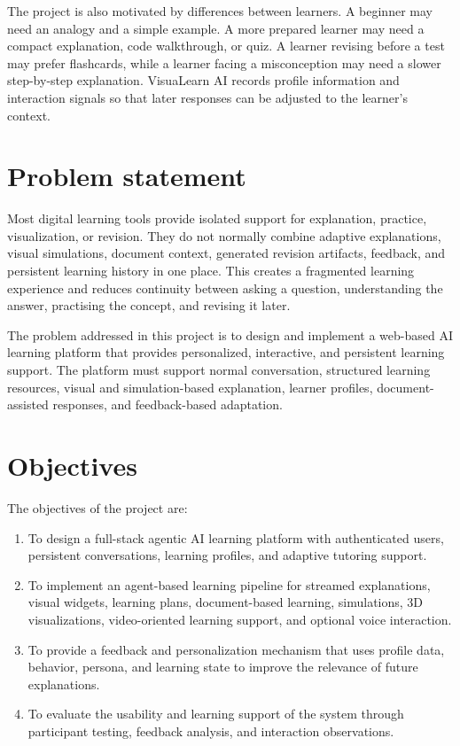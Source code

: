 The project is also motivated by differences between learners. A beginner may need an analogy and a simple example. A more prepared learner may need a compact explanation, code walkthrough, or quiz. A learner revising before a test may prefer flashcards, while a learner facing a misconception may need a slower step-by-step explanation. VisuaLearn AI records profile information and interaction signals so that later responses can be adjusted to the learner's context.

\section[Problem statement]{\textbf{Problem statement}}

Most digital learning tools provide isolated support for explanation, practice, visualization, or revision. They do not normally combine adaptive explanations, visual simulations, document context, generated revision artifacts, feedback, and persistent learning history in one place. This creates a fragmented learning experience and reduces continuity between asking a question, understanding the answer, practising the concept, and revising it later.

The problem addressed in this project is to design and implement a web-based AI learning platform that provides personalized, interactive, and persistent learning support. The platform must support normal conversation, structured learning resources, visual and simulation-based explanation, learner profiles, document-assisted responses, and feedback-based adaptation.

\section[Objectives]{\textbf{Objectives}}

The objectives of the project are:
\begin{enumerate}[leftmargin=1.2cm]
\item To design a full-stack agentic AI learning platform with authenticated users, persistent conversations, learning profiles, and adaptive tutoring support.
\item To implement an agent-based learning pipeline for streamed explanations, visual widgets, learning plans, document-based learning, simulations, 3D visualizations, video-oriented learning support, and optional voice interaction.
\item To provide a feedback and personalization mechanism that uses profile data, behavior, persona, and learning state to improve the relevance of future explanations.
\item To evaluate the usability and learning support of the system through participant testing, feedback analysis, and interaction observations.
\end{enumerate}

